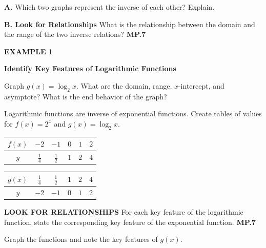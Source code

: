 \documentclass{article}
\newenvironment{model-discuss}{}{}
\newenvironment{concept-box}{}{}
\newenvironment{example}[1]{\textbf{EXAMPLE #1}\par}{\par}
\begin{document}
\begin{model-discuss}
\textbf{A.} Which two graphs represent the inverse of each other? Explain.

\textbf{B. Look for Relationships} What is the relationship between the domain and the range of the two inverse relations? \textbf{MP.7}
\end{model-discuss}

\begin{example}{1}
\textbf{Identify Key Features of Logarithmic Functions}

Graph $g(x) = \log_2 x$. What are the domain, range, $x$-intercept, and asymptote? What is the end behavior of the graph?

Logarithmic functions are inverse of exponential functions. Create tables of values for $f(x) = 2^x$ and $g(x) = \log_2 x$.

\begin{center}
\begin{tabular}{|c|c|c|c|c|c|}
\hline
$f(x)$ & $-2$ & $-1$ & $0$ & $1$ & $2$ \\
\hline
$y$ & $\frac{1}{4}$ & $\frac{1}{2}$ & $1$ & $2$ & $4$ \\
\hline
\end{tabular}
\quad
\begin{tabular}{|c|c|c|c|c|c|}
\hline
$g(x)$ & $\frac{1}{4}$ & $\frac{1}{2}$ & $1$ & $2$ & $4$ \\
\hline
$y$ & $-2$ & $-1$ & $0$ & $1$ & $2$ \\
\hline
\end{tabular}
\end{center}

\begin{concept-box}
\textbf{LOOK FOR RELATIONSHIPS}
For each key feature of the logarithmic function, state the corresponding key feature of the exponential function. \textbf{MP.7}
\end{concept-box}

Graph the functions and note the key features of $g(x)$.

\begin{center}
\end{center}


\end{example}
\end{document}
